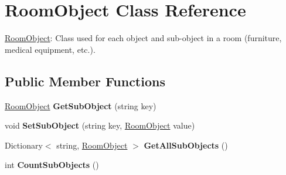 \hypertarget{class_room_object}{}\section{Room\+Object Class Reference}
\label{class_room_object}


\hyperlink{class_room_object}{Room\+Object}\+: Class used for each object and sub-\/object in a room (furniture, medical equipment, etc.).  


\subsection*{Public Member Functions}
\begin{DoxyCompactItemize}
\item 
\hyperlink{class_room_object}{Room\+Object} {\bfseries Get\+Sub\+Object} (string key)\hypertarget{class_room_object_a7551cc9378c0a715f9c474ab9700df51}{}\label{class_room_object_a7551cc9378c0a715f9c474ab9700df51}

\item 
void {\bfseries Set\+Sub\+Object} (string key, \hyperlink{class_room_object}{Room\+Object} value)\hypertarget{class_room_object_a226cc6c90cce4179c76c26d9928eece8}{}\label{class_room_object_a226cc6c90cce4179c76c26d9928eece8}

\item 
Dictionary$<$ string, \hyperlink{class_room_object}{Room\+Object} $>$ {\bfseries Get\+All\+Sub\+Objects} ()\hypertarget{class_room_object_a7f2767bb854edcd01da10165a83fe6e4}{}\label{class_room_object_a7f2767bb854edcd01da10165a83fe6e4}

\item 
int {\bfseries Count\+Sub\+Objects} ()\hypertarget{class_room_object_ade600b4ed09c67049577169c2e0d7725}{}\label{class_room_object_ade600b4ed09c67049577169c2e0d7725}


\end{DoxyCompactItemize}

